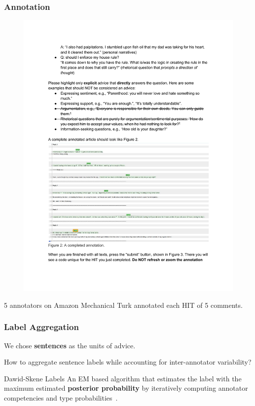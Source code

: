 \begin{frame}[c]\frametitle{Annotation}
    \begin{figure}
        \centering
        \includegraphics[width=\linewidth]{figures/ann-2.pdf}
        \caption{}
    \end{figure}

5 annotators on Amazon Mechanical Turk annotated each HIT of 5 comments.

\end{frame}


\begin{frame}[c]\frametitle{Label Aggregation}

We chose \textbf{sentences} as the units of advice.

How to aggregate sentence labels while accounting for inter-annotator variability?

\pause

\vfill

\begin{alertblock}{Dawid-Skene Labels}
        An EM based algorithm that estimates the label with the maximum estimated \textbf{posterior probability} by iteratively computing annotator competencies and type probabilities~\citep{dawid_maximum_1979}.
\end{alertblock}

\end{frame}


